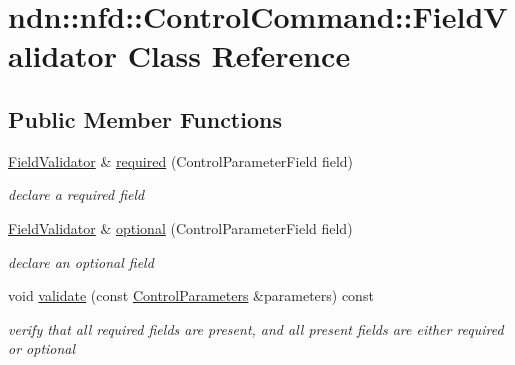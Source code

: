 \hypertarget{classndn_1_1nfd_1_1ControlCommand_1_1FieldValidator}{}\section{ndn\+:\+:nfd\+:\+:Control\+Command\+:\+:Field\+Validator Class Reference}
\label{classndn_1_1nfd_1_1ControlCommand_1_1FieldValidator}
\subsection*{Public Member Functions}
\begin{DoxyCompactItemize}
\item 
\hyperlink{classndn_1_1nfd_1_1ControlCommand_1_1FieldValidator}{Field\+Validator} \& \hyperlink{classndn_1_1nfd_1_1ControlCommand_1_1FieldValidator_a555e06187c80c9053c52ad5912e6f996}{required} (Control\+Parameter\+Field field)\hypertarget{classndn_1_1nfd_1_1ControlCommand_1_1FieldValidator_a555e06187c80c9053c52ad5912e6f996}{}\label{classndn_1_1nfd_1_1ControlCommand_1_1FieldValidator_a555e06187c80c9053c52ad5912e6f996}

\begin{DoxyCompactList}\small\item\em declare a required field \end{DoxyCompactList}\item 
\hyperlink{classndn_1_1nfd_1_1ControlCommand_1_1FieldValidator}{Field\+Validator} \& \hyperlink{classndn_1_1nfd_1_1ControlCommand_1_1FieldValidator_a5ef831a5b3149ea29658cb17a405528f}{optional} (Control\+Parameter\+Field field)\hypertarget{classndn_1_1nfd_1_1ControlCommand_1_1FieldValidator_a5ef831a5b3149ea29658cb17a405528f}{}\label{classndn_1_1nfd_1_1ControlCommand_1_1FieldValidator_a5ef831a5b3149ea29658cb17a405528f}

\begin{DoxyCompactList}\small\item\em declare an optional field \end{DoxyCompactList}\item 
void \hyperlink{classndn_1_1nfd_1_1ControlCommand_1_1FieldValidator_a66bf3bd0f33ea728b91d0e06121eae4f}{validate} (const \hyperlink{classndn_1_1nfd_1_1ControlParameters}{Control\+Parameters} \&parameters) const
\begin{DoxyCompactList}\small\item\em verify that all required fields are present, and all present fields are either required or optional \end{DoxyCompactList}\end{DoxyCompactItemize}


